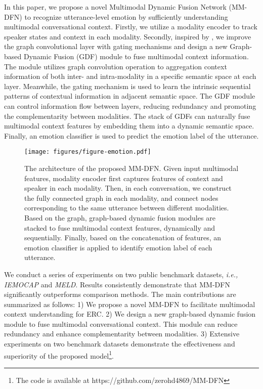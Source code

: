 In this paper, we propose a novel Multimodal Dynamic Fusion Network (MM-DFN) to recognize utterance-level emotion by sufficiently understanding multimodal conversational context.
Firstly, we utilize a modality encoder to 
track speaker states and context in each modality. 
Secondly, 
inspired by \cite{DBLP:journals/neco/HochreiterS97,DBLP:conf/icml/ChenWHDL20},
we improve the graph convolutional layer  \cite{DBLP:conf/iclr/KipfW17} with gating mechanisms and design a new Graph-based Dynamic Fusion (GDF) module to fuse multimodal context information. 
The module utilizes graph convolution operation to aggregation context information of both inter- and intra-modality in a specific semantic space at each layer.
Meanwhile, the gating mechanism is used to learn the intrinsic sequential patterns of contextual information in adjacent semantic space. The GDF module can control information flow between layers, reducing redundancy and promoting the complementarity between modalities.
The stack of GDFs can naturally fuse multimodal context features by embedding them into a dynamic semantic space. %
Finally, 
an emotion classifier is used to predict the emotion label of the utterance.
 

\begin{figure*}[t]
  \centering
  \texttt{[image: figures/figure-emotion.pdf]}
  \caption{The architecture of the proposed MM-DFN. Given input multimodal features, modality encoder first captures features of context and speaker in each modality.
  Then, in each conversation, we construct the fully connected graph in each modality, and connect nodes corresponding to the same utterance between different modalities.
  Based on the graph, graph-based dynamic fusion modules are stacked to fuse multimodal context features, dynamically and sequentially.  
    Finally, based on the concatenation of features, an emotion classifier is applied to identify emotion label of each utterance.
 }
  \label{fig:overall}
\end{figure*}
 

We conduct a series of experiments on two public benchmark datasets, {\it i.e.,} {\it IEMOCAP} and {\it MELD}. Results consistently demonstrate that MM-DFN significantly outperforms comparison methods.  %
The main contributions are summarized as follows:
1) We propose a novel MM-DFN to facilitate multimodal context understanding for ERC. 
2) We design a new graph-based dynamic fusion module to fuse multimodal conversational context.
This module can reduce redundancy and enhance complementarity between modalities.
3) Extensive experiments on two benchmark datasets demonstrate the effectiveness and superiority of the proposed model\footnote{The code is available at {https://github.com/zerohd4869/MM-DFN}}.

